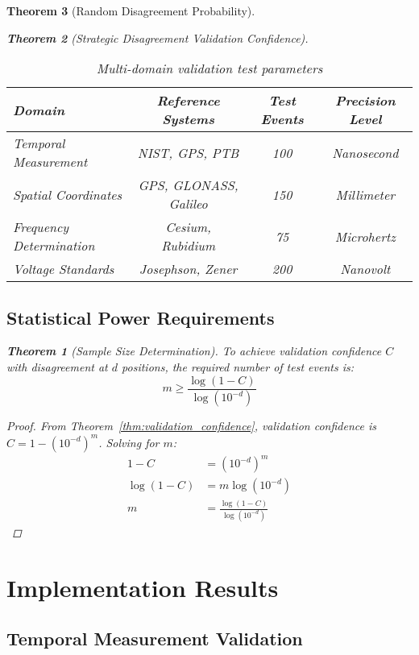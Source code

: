 \documentclass[12pt,a4paper]{article}
\newtheorem{theorem}{Theorem}
\begin{document}
\begin{theorem}[Random Disagreement Probability]
\begin{theorem}[Strategic Disagreement Validation Confidence]
\begin{table}[H]
\centering
\begin{tabular}{lccc}
\toprule
\textbf{Domain} & \textbf{Reference Systems} & \textbf{Test Events} & \textbf{Precision Level} \\
\midrule
Temporal Measurement & NIST, GPS, PTB & 100 & Nanosecond \\
Spatial Coordinates & GPS, GLONASS, Galileo & 150 & Millimeter \\
Frequency Determination & Cesium, Rubidium & 75 & Microhertz \\
Voltage Standards & Josephson, Zener & 200 & Nanovolt \\
\bottomrule
\end{tabular}
\caption{Multi-domain validation test parameters}
\label{tab:validation_domains}
\end{table}

\subsection{Statistical Power Requirements}

\begin{theorem}[Sample Size Determination]
To achieve validation confidence $C$ with disagreement at $d$ positions, the required number of test events is:
\begin{equation}
m \geq \frac{\log(1-C)}{\log(10^{-d})}
\end{equation}
\end{theorem}

\begin{proof}
From Theorem~\ref{thm:validation_confidence}, validation confidence is $C = 1 - (10^{-d})^m$.
Solving for $m$:
\begin{align}
1 - C &= (10^{-d})^m \\
\log(1-C) &= m \log(10^{-d}) \\
m &= \frac{\log(1-C)}{\log(10^{-d})}
\end{align}
\end{proof}

\section{Implementation Results}

\subsection{Temporal Measurement Validation}


\end{theorem}
\end{theorem}
\end{document}
